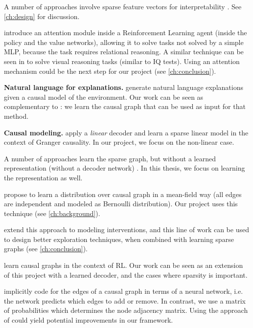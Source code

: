 \documentclass[a4paper,11pt,oneside]{report}
\begin{document}
A number of approaches involve sparse feature vectors for interpretability \cite{Weinstein,Zhu2017,VandenOord2017,Cha2018,Deng,Liu2018,Javed2019,Rafati2019,Pei2019,Lillicrap2019,Petros2020,Fallah2020,Javed2020}. See \autoref{ch:design} for discussion.

 \cite{zambaldi2018relational} introduce an attention module inside a Reinforcement Learning agent (inside the policy and the value networks), allowing it to solve tasks not solved by a simple MLP, because the task requires relational reasoning. A similar technique can be seen in \cite{hahne2019attention} to solve visual reasoning tasks (similar to IQ tests).
Using an attention mechanism could be the next step for our project (see \autoref{ch:conclusion}).


{\bf Natural language for explanations.}
 \cite{Madumal2019,Ehsan2018} generate natural language explanations given a causal model of the environment. Our work can be seen as complementary to \cite{Madumal2019}: we learn the causal graph that can be used as input for that method.


{\bf Causal modeling.}
 \cite{Barnett2015} apply a {\em linear} decoder and learn a sparse linear model in the context of Granger causality. In our project, we focus on the non-linear case.

A number of approaches learn the sparse graph, but without a learned representation (without a decoder network) \cite{Kalainathan2018,Fu2013,Ke2019,Chalupka2017,Javed2020,Battaglia2016}. In this thesis, we focus on learning the representation as well.

 \cite{Kalainathan2018, Ng2019} propose to learn a distribution over causal graph in a mean-field way (all edges are independent and modeled as Bernoulli distribution). Our project uses this technique (see \ref{ch:background}).

 \cite{brouillard2020differentiable} extend this approach to modeling interventions, and this line of work can be used to design better exploration techniques, when combined with learning sparse graphs (see \autoref{ch:conclusion}).

 \cite{Javed} learn causal graphs in the context of RL. Our work can be seen as an extension of this project with a learned decoder, and the cases where sparsity is important.

 \cite{Nair2019} implicitly code for the edges of a causal graph in terms of a neural network, i.e. the network predicts which edges to add or remove. In contrast, we use a matrix of probabilities which determines the node adjacency matrix. Using the approach of \cite{Nair2019} could yield potential improvements in our framework.
\end{document}
